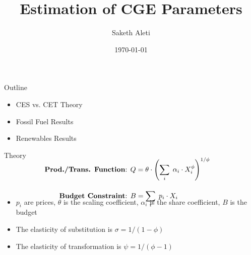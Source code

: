 \documentclass[11pt,aspectratio=169]{beamer}
\author{Saketh Aleti}
\title{Estimation of CGE Parameters}
\date{\today}
\begin{document}
	
	
\maketitle

\begin{frame}{Outline}

\begin{itemize}
	\setlength\itemsep{1.5em}
	\item CES vs. CET Theory
	
	\item Fossil Fuel Results
	
	\item Renewables Results
	
\end{itemize}

\end{frame}

\begin{frame}{Theory}

	
	
	\begin{block}{}
	\large \begin{align*}
	 \\[-3em] \text{\textbf{Prod./Trans. Function}: } &Q = \theta \cdot \left( \sum_i \; \alpha_i \cdot X_i^\phi \right)^{1/\phi} \\[1em]
	\text{\textbf{Budget Constraint}: } &B = \sum_i \;p_i \cdot  X_i \\[-2.5em]
	\end{align*}
	\end{block}
	

	\begin{itemize}
		\item $p_i$ are prices, $\theta$ is the scaling coefficient, $\alpha_i$ is the share coefficient, $B$ is the budget
		\item The elasticity of substitution is $\sigma = 1 / (1-\phi)$
		\item The elasticity of transformation is $\psi = 1 / (\phi - 1)$
	\end{itemize}
\end{frame}
\end{document}
